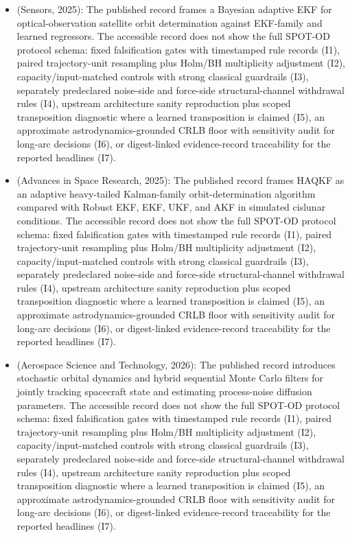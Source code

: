 \begin{itemize}[leftmargin=*]
  \item \cite{zhu2025bayesian} (Sensors, 2025): The published record frames a Bayesian adaptive EKF for optical-observation satellite orbit determination against EKF-family and learned regressors. The accessible record does not show the full SPOT-OD protocol schema: fixed falsification gates with timestamped rule records (I1), paired trajectory-unit resampling plus Holm/BH multiplicity adjustment (I2), capacity/input-matched controls with strong classical guardrails (I3), separately predeclared noise-side and force-side structural-channel withdrawal rules (I4), upstream architecture sanity reproduction plus scoped transposition diagnostic where a learned transposition is claimed (I5), an approximate astrodynamics-grounded CRLB floor with sensitivity audit for long-arc decisions (I6), or digest-linked evidence-record traceability for the reported headlines (I7).
  \item \cite{gao2025heavytailed} (Advances in Space Research, 2025): The published record frames HAQKF as an adaptive heavy-tailed Kalman-family orbit-determination algorithm compared with Robust EKF, EKF, UKF, and AKF in simulated cislunar conditions. The accessible record does not show the full SPOT-OD protocol schema: fixed falsification gates with timestamped rule records (I1), paired trajectory-unit resampling plus Holm/BH multiplicity adjustment (I2), capacity/input-matched controls with strong classical guardrails (I3), separately predeclared noise-side and force-side structural-channel withdrawal rules (I4), upstream architecture sanity reproduction plus scoped transposition diagnostic where a learned transposition is claimed (I5), an approximate astrodynamics-grounded CRLB floor with sensitivity audit for long-arc decisions (I6), or digest-linked evidence-record traceability for the reported headlines (I7).
  \item \cite{sztamfater2026sequential} (Aerospace Science and Technology, 2026): The published record introduces stochastic orbital dynamics and hybrid sequential Monte Carlo filters for jointly tracking spacecraft state and estimating process-noise diffusion parameters. The accessible record does not show the full SPOT-OD protocol schema: fixed falsification gates with timestamped rule records (I1), paired trajectory-unit resampling plus Holm/BH multiplicity adjustment (I2), capacity/input-matched controls with strong classical guardrails (I3), separately predeclared noise-side and force-side structural-channel withdrawal rules (I4), upstream architecture sanity reproduction plus scoped transposition diagnostic where a learned transposition is claimed (I5), an approximate astrodynamics-grounded CRLB floor with sensitivity audit for long-arc decisions (I6), or digest-linked evidence-record traceability for the reported headlines (I7).

\end{itemize}
